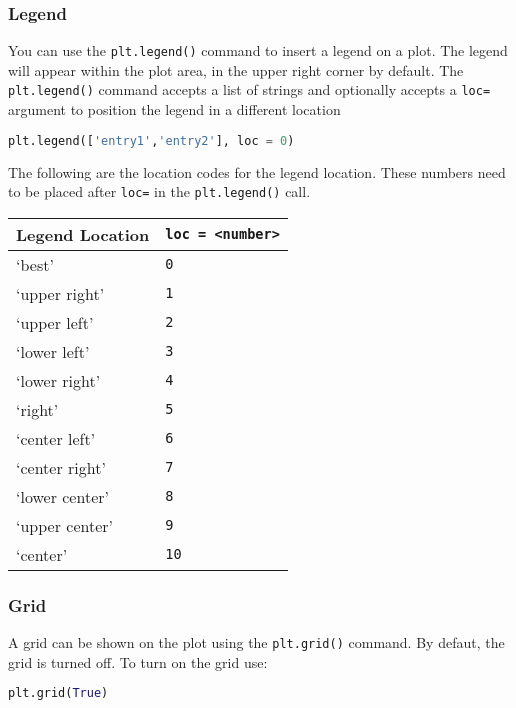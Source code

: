 \documentclass{book}
\newcommand{\passthrough}[1]{#1}
\begin{document}
    
        \hypertarget{legend}{%
\subsubsection{Legend}\label{legend}}

You can use the \passthrough{\lstinline!plt.legend()!} command to insert
a legend on a plot. The legend will appear within the plot area, in the
upper right corner by default. The
\passthrough{\lstinline!plt.legend()!} command accepts a list of strings
and optionally accepts a \passthrough{\lstinline!loc=!} argument to
position the legend in a different location

\begin{lstlisting}[language=Python]
plt.legend(['entry1','entry2'], loc = 0)
\end{lstlisting}

The following are the location codes for the legend location. These
numbers need to be placed after \passthrough{\lstinline!loc=!} in the
\passthrough{\lstinline!plt.legend()!} call.

\begin{longtable}[]{@{}ll@{}}
\toprule
Legend Location &
\passthrough{\lstinline!loc = <number>!}\tabularnewline
\midrule
\endhead
`best' & \passthrough{\lstinline!0!}\tabularnewline
`upper right' & \passthrough{\lstinline!1!}\tabularnewline
`upper left' & \passthrough{\lstinline!2!}\tabularnewline
`lower left' & \passthrough{\lstinline!3!}\tabularnewline
`lower right' & \passthrough{\lstinline!4!}\tabularnewline
`right' & \passthrough{\lstinline!5!}\tabularnewline
`center left' & \passthrough{\lstinline!6!}\tabularnewline
`center right' & \passthrough{\lstinline!7!}\tabularnewline
`lower center' & \passthrough{\lstinline!8!}\tabularnewline
`upper center' & \passthrough{\lstinline!9!}\tabularnewline
`center' & \passthrough{\lstinline!10!}\tabularnewline
\bottomrule
\end{longtable}
    




    
        \hypertarget{grid}{%
\subsubsection{Grid}\label{grid}}

A grid can be shown on the plot using the
\passthrough{\lstinline!plt.grid()!} command. By defaut, the grid is
turned off. To turn on the grid use:

\begin{lstlisting}[language=Python]
plt.grid(True)
\end{lstlisting}
\end{document}
